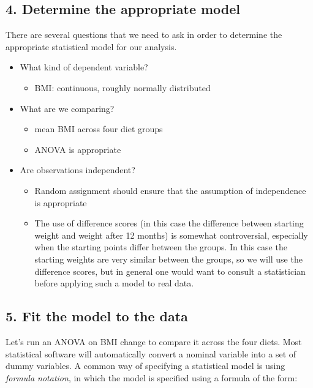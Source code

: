 \documentclass[12pt,]{book}
\providecommand{\tightlist}{%
  \setlength{\itemsep}{0pt}\setlength{\parskip}{0pt}}
\theoremstyle{definition}
\theoremstyle{definition}
\theoremstyle{definition}
\theoremstyle{remark}
\begin{document}
\hypertarget{determine-the-appropriate-model}{%
\subsection{4. Determine the appropriate model}\label{determine-the-appropriate-model}}

There are several questions that we need to ask in order to determine the appropriate statistical model for our analysis.

\begin{itemize}
\tightlist
\item
  What kind of dependent variable?

  \begin{itemize}
  \tightlist
  \item
    BMI: continuous, roughly normally distributed
  \end{itemize}
\item
  What are we comparing?

  \begin{itemize}
  \tightlist
  \item
    mean BMI across four diet groups
  \item
    ANOVA is appropriate
  \end{itemize}
\item
  Are observations independent?

  \begin{itemize}
  \tightlist
  \item
    Random assignment should ensure that the assumption of independence is appropriate
  \item
    The use of difference scores (in this case the difference between starting weight and weight after 12 months) is somewhat controversial, especially when the starting points differ between the groups. In this case the starting weights are very similar between the groups, so we will use the difference scores, but in general one would want to consult a statistician before applying such a model to real data.
  \end{itemize}
\end{itemize}

\hypertarget{fit-the-model-to-the-data}{%
\subsection{5. Fit the model to the data}\label{fit-the-model-to-the-data}}

Let's run an ANOVA on BMI change to compare it across the four diets. Most statistical software will automatically convert a nominal variable into a set of dummy variables. A common way of specifying a statistical model is using \emph{formula notation}, in which the model is specified using a formula of the form:
\end{document}
